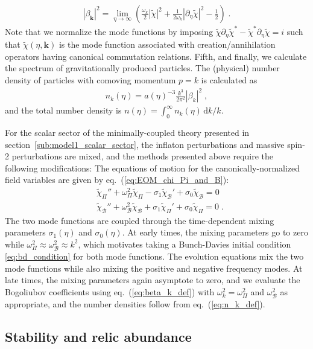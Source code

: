 \documentclass[11pt,a4paper]{article}
\newcommand{\ba}[1]{\begin{align} #1 \end{align}}
\newcommand{\bes}[1]{\begin{equation}\begin{split} #1 \end{split}\end{equation}}
\newcommand{\kvec}{{\bm k}}
\newcommand{\sref}[1]{section~\ref{#1}}
\newcommand{\eref}[1]{eq.~(\ref{#1})}
\begin{document}
\ba{
\label{eq:beta_k_def}
    |\beta_\kvec|^2 = \lim_{\eta \to \infty} \left( \frac{\omega_k}{2} | \tilde{\chi} |^2 + \frac{1}{2\omega_k} | \partial_\eta \tilde{\chi} |^2 -\frac{1}{2} \right) 
    \;.
}
Note that we normalize the mode functions by imposing $\tilde{\chi} \partial_\eta \tilde{\chi}^\ast - \tilde{\chi}^\ast \partial_\eta \tilde{\chi} = i$ such that $\tilde{\chi}(\eta,\kvec)$ is the mode function associated with creation/annihilation operators having canonical commutation relations.   Fifth, and finally, we calculate the spectrum of gravitationally produced particles.  The (physical) number density of particles with comoving momentum $p=k$ is calculated as 
\ba{
\label{eq:n_k_def}
	n_k(\eta) = a(\eta)^{-3} \frac{k^3}{2\pi^2} |\beta_k|^2
	\;,
}
and the total number density is $n(\eta) = \int_0^\infty n_k(\eta) \, \mathrm{d}k / k$.  

For the scalar sector of the minimally-coupled theory presented in \sref{sub:model1_scalar_sector}, the inflaton perturbations and massive spin-2 perturbations are mixed, and the methods presented above require the following modifications:  The equations of motion for the canonically-normalized field variables are given by \eref{eq:EOM_chi_Pi_and_B}: 
\bes{
    & \tilde{\chi}_\Pi'' + \omega_\Pi^2 \tilde{\chi}_\Pi - \sigma_1 \tilde{\chi}_\mathcal{B}' + \sigma_0 \tilde{\chi}_\mathcal{B} = 0 \\
    & \tilde{\chi}_\mathcal{B}'' + \omega_\mathcal{B}^2 \tilde{\chi}_\mathcal{B} + \sigma_1 \tilde{\chi}_\Pi' + \sigma_0 \tilde{\chi}_\Pi = 0
    \;.
}
The two mode functions are coupled through the time-dependent mixing parameters $\sigma_1(\eta)$ and $\sigma_0(\eta)$.  At early times, the mixing parameters go to zero while $\omega_\Pi^2 \approx \omega_\mathcal{B}^2 \approx k^2$, which motivates taking a Bunch-Davies initial condition \eqref{eq:bd_condition} for both mode functions.  The evolution equations mix the two mode functions while also mixing the positive and negative frequency modes.  At late times, the mixing parameters again asymptote to zero, and we evaluate the Bogoliubov coefficients using \eref{eq:beta_k_def} with $\omega_k^2 = \omega_\Pi^2$ and $\omega_\mathcal{B}^2$ as appropriate, and the number densities follow from \eref{eq:n_k_def}.  

\subsection{Stability and relic abundance}
\label{sub:stability}
\end{document}
